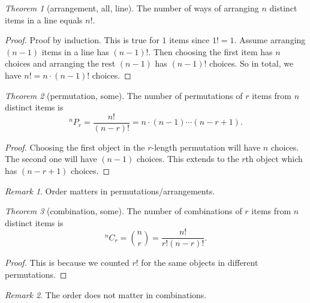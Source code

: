 \documentclass[8pt]{article}
\theoremstyle{remark}
\newtheorem{theorem}{Theorem}[section]
\newtheorem*{remark}{Remark}
\begin{document}
        \begin{theorem}[arrangement, all, line]
            The number of ways of arranging $n$ distinct items in a line equals $n!$.
            \begin{proof}
                Proof by induction. This is true for $1$ items since $1! = 1$. Assume arranging $(n - 1)$ items in a line has $(n - 1)!$. Then choosing the first item has $n$ choices and arranging the rest $(n - 1)$ has $(n - 1)!$ choices. So in total, we have $n! = n \cdot (n - 1)!$ choices. 
            \end{proof}
        \end{theorem}

        \begin{theorem}[permutation, some]
            The number of permutations of $r$ items from $n$ distinct items is
            $$
                ^nP_r = \frac{n!}{(n-r)!} = n \cdot (n-1) \cdots (n - r + 1).
            $$
            \begin{proof}
                Choosing the first object in the $r$-length permutation will have $n$ choices. The second one will have $(n - 1)$ choices. This extends to the $r$th object which has $(n - r + 1)$ choices.
            \end{proof}
        \end{theorem}

        \begin{remark}
            Order matters in permutations/arrangements.
        \end{remark}

        \begin{theorem}[combination, some]
            The number of combinations of $r$ items from $n$ distinct items is
            $$
                ^nC_r = \binom{n}{r} = \frac{n!}{r! (n-r)!}.
            $$
            \begin{proof}
                This is because we counted $r!$ for the same objects in different permutations.
            \end{proof}
        \end{theorem}

        \begin{remark}
            The order does not matter in combinations.
        \end{remark}
\end{document}
